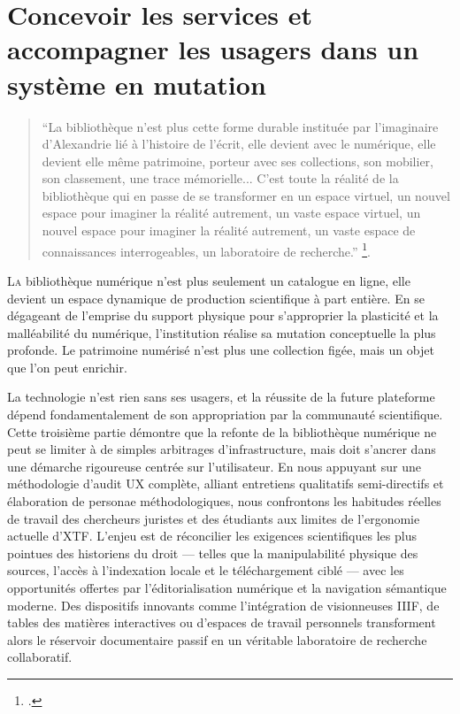 \documentclass[12pt,twoside]{book}
\begin{document}
	
	\part{Concevoir les services et accompagner les usagers dans un système en mutation}
	

\begin{quote}
	\enquote{La bibliothèque n'est plus cette forme durable instituée par l'imaginaire d'Alexandrie lié à l'histoire de l'écrit, elle devient avec le numérique, elle devient elle même patrimoine, porteur avec ses collections, son mobilier, son classement, une trace mémorielle... C'est toute la réalité de la bibliothèque qui en passe de se transformer en un espace virtuel, un nouvel espace pour imaginer la réalité autrement, un vaste espace virtuel, un nouvel espace pour imaginer la réalité autrement, un vaste espace de connaissances interrogeables, un laboratoire de recherche.} \footcite{elBibliothequeNumeriqueCognition}.
\end{quote}

\lettrine{L}a bibliothèque numérique n'est plus seulement un catalogue en ligne, elle devient un espace dynamique de production scientifique à part entière. En se dégageant de l'emprise du support physique pour s'approprier la plasticité et la malléabilité du numérique, l'institution réalise sa mutation conceptuelle la plus profonde. Le patrimoine numérisé n'est plus une collection figée, mais un objet que l'on peut enrichir.

La technologie n’est rien sans ses usagers, et la réussite de la future plateforme  dépend fondamentalement de son appropriation par la communauté scientifique. Cette troisième partie démontre que la refonte de la bibliothèque numérique ne peut se limiter à de simples arbitrages d'infrastructure, mais doit s'ancrer dans une démarche rigoureuse centrée sur l'utilisateur. En nous appuyant sur une méthodologie d'audit UX complète, alliant entretiens qualitatifs semi-directifs et élaboration de personae méthodologiques, nous confrontons les habitudes réelles de travail des chercheurs juristes et des étudiants aux limites de l'ergonomie actuelle d'XTF. L'enjeu est de réconcilier les exigences scientifiques les plus pointues des historiens du droit — telles que la manipulabilité physique des sources, l'accès à l'indexation locale et le téléchargement ciblé — avec les opportunités offertes par l'éditorialisation numérique et la navigation sémantique moderne. Des dispositifs innovants comme l'intégration de visionneuses IIIF, de tables des matières interactives ou d'espaces de travail personnels transforment alors le réservoir documentaire passif en un véritable laboratoire de recherche collaboratif.
\end{document}
